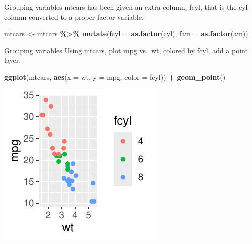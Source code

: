 \documentclass[
  ignorenonframetext,
]{beamer}
\newenvironment{Shaded}{\begin{snugshade}}{\end{snugshade}}
\newcommand{\AttributeTok}[1]{\textcolor[rgb]{0.13,0.29,0.53}{#1}}
\newcommand{\FunctionTok}[1]{\textcolor[rgb]{0.13,0.29,0.53}{\textbf{#1}}}
\newcommand{\NormalTok}[1]{#1}
\newcommand{\OtherTok}[1]{\textcolor[rgb]{0.56,0.35,0.01}{#1}}
\newcommand{\SpecialCharTok}[1]{\textcolor[rgb]{0.81,0.36,0.00}{\textbf{#1}}}
\begin{document}
\begin{frame}[fragile]{Grouping variables}
\label{grouping-variables-1}
mtcars has been given an extra column, fcyl, that is the cyl column
converted to a proper factor variable.


\begin{Shaded}
\begin{Highlighting}[]
\NormalTok{mtcars }\OtherTok{\textless{}{-}}\NormalTok{ mtcars }\SpecialCharTok{\%\textgreater{}\%}
    \FunctionTok{mutate}\NormalTok{(}\AttributeTok{fcyl =} \FunctionTok{as.factor}\NormalTok{(cyl), }\AttributeTok{fam =} \FunctionTok{as.factor}\NormalTok{(am))}
\end{Highlighting}
\end{Shaded}
\end{frame}

\begin{frame}[fragile]{Grouping variables}
\label{grouping-variables-2}
Using mtcars, plot mpg vs.~wt, colored by fcyl, add a point layer.


\begin{Shaded}
\begin{Highlighting}[]
\FunctionTok{ggplot}\NormalTok{(mtcars, }\FunctionTok{aes}\NormalTok{(}\AttributeTok{x =}\NormalTok{ wt, }\AttributeTok{y =}\NormalTok{ mpg, }\AttributeTok{color =}\NormalTok{ fcyl)) }\SpecialCharTok{+} \FunctionTok{geom\_point}\NormalTok{()}
\end{Highlighting}
\end{Shaded}

\begin{center}\includegraphics[width=0.5\linewidth]{Figs/unnamed-chunk-7-1} \end{center}
\end{frame}
\end{document}
